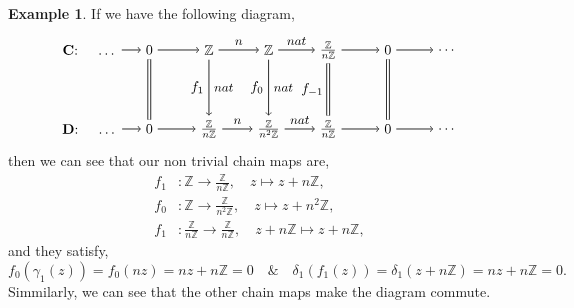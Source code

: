 \documentclass[11.5pt, twoside, a4paper, titlepage]{report}
\providecommand{\bb}[1]{\mathbb{#1}}
\theoremstyle{definition}
\newtheorem{eg}[mydef]{Example}
\theoremstyle{plain}
\begin{document}
\begin{eg}
If we have the following diagram,
\begin{equation*}
\begin{tikzpicture}[->,-latex, auto, main path/.style={->, semithick}, main node/.style={}]
\node	[main node]		(1) at (0,0)		{$\mathbf{C}$: \quad \dots};
\node	[main node]		(2) at (1.5,0)		{$0$};
\node	[main node]		(3) at (3,0)		{$\bb{Z}$};
\node [main node]		(4) at (4.5,0)		{$\bb{Z}$};
\node [main node]		(5) at (6,0)		{$\frac{\bb{Z}}{n\bb{Z}}$};
\node	[main node]		(11) at (7.5,0)	{$0$};
\node [main node] 		(12) at (9,0)	{\dots};
\node	[main node]		(6) at (0,-2)		{$\mathbf{D}$: \quad \dots};
\node	[main node]		(7) at (1.5,-2)		{$0$};
\node	[main node]		(8) at (3,-2)		{$\frac{\bb{Z}}{n\bb{Z}}$};
\node [main node]		(9) at (4.5,-2)		{$\frac{\bb{Z}}{n^2\bb{Z}}$};
\node [main node]		(10) at (6,-2)	{$\frac{\bb{Z}}{n\bb{Z}}$};
\node [main node]		(13) at (7.5,-2)	{$0$};
\node [main node]		(14) at (9,-2)	{\dots};

\draw (1) edge [main path] node [auto] {$$} (2);
\draw (2) edge [main path] node [auto] {$$} (3);
\draw (3) edge [main path] node [auto] {\small $n$} (4);
\draw (4) edge [main path] node [auto] {\small $nat$} (5);
\draw (5) edge [main path] (11);
\draw (11) edge [main path] (12);
\draw (6) edge [main path] node [auto] {$$} (7);
\draw (7) edge [main path] node [auto] {$$} (8);
\draw (8) edge [main path] node [auto] {\small $n$} (9);
\draw (9) edge [main path] node [auto] {\small $nat$} (10);
\draw (10) edge [main path] (13);
\draw (13) edge [main path] (14);
\draw (3) edge [main path] node [auto, swap] {$f_{1}$} node [auto] {\small $nat$} (8);
\draw (4) edge [main path] node [auto, swap] {$f_{0}$} node [auto] {\small $nat$} (9);
\draw (5) edge [-, semithick, double, double distance=1.5pt] node [auto, swap] {$f_{-1}$} (10);
\draw (11) edge [-, semithick, double, double distance=1.5pt] (13);
\draw (2) edge [-, semithick, double, double distance=1.5pt] (7);
\end{tikzpicture}
\end{equation*}
then we can see that our non trivial chain maps are, 
\begin{align*}
f_{1} &: \bb{Z} \to \frac{\bb{Z}}{n\bb{Z}}, \quad z \mapsto z+n\bb{Z},\\
f_0 &: \bb{Z} \to \frac{\bb{Z}}{n^2\bb{Z}}, \quad z \mapsto z+n^2\bb{Z}, \\
f_{1} &: \frac{\bb{Z}}{n\bb{Z}} \to \frac{\bb{Z}}{n\bb{Z}}, \quad z+n\bb{Z} \mapsto z+n\bb{Z}, 
\end{align*}
and they satisfy, 
\begin{equation*}
f_0(\gamma_1(z))=f_0(nz)=nz+n\bb{Z}=0\quad \& \quad \delta_1(f_1(z))=\delta_1(z+n\bb{Z})=nz+n\bb{Z}=0.
\end{equation*}
Simmilarly, we can see that the other chain maps make the diagram commute.
\end{eg}
\end{document}
